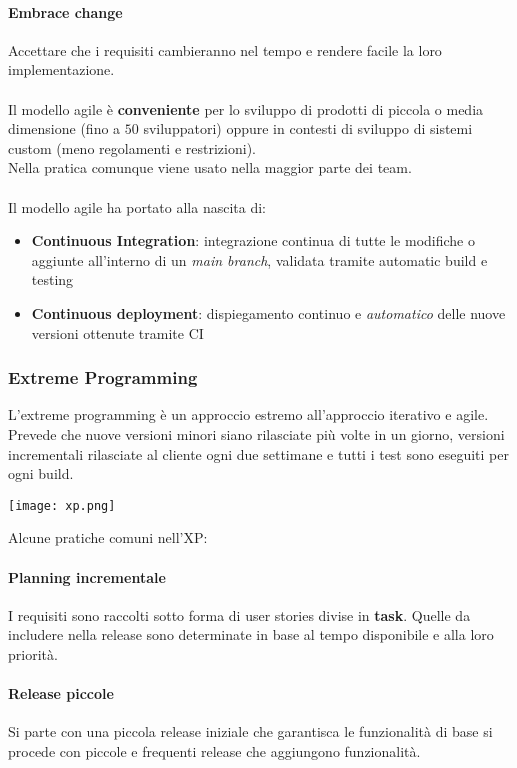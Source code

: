 \paragraph{Embrace change} Accettare che i requisiti cambieranno nel tempo e rendere facile la loro implementazione.\\\\

Il modello agile è \textbf{conveniente} per lo sviluppo di prodotti di piccola o media dimensione (fino a $50$ sviluppatori) oppure in contesti di sviluppo di sistemi custom (meno regolamenti e restrizioni).\\
Nella pratica comunque viene usato nella maggior parte dei team.\\\\

\noindent Il modello agile ha portato alla nascita di:
\begin{itemize}
	\item \textbf{Continuous Integration}: integrazione continua di tutte le modifiche o aggiunte all'interno di un \textit{main branch}, validata tramite automatic build e testing
	\item \textbf{Continuous deployment}: dispiegamento continuo e \textit{automatico} delle nuove versioni ottenute tramite CI
\end{itemize}

\subsubsection{Extreme Programming}
L'extreme programming è un approccio estremo all'approccio iterativo e agile. Prevede che nuove versioni minori siano rilasciate più volte in un giorno, versioni incrementali rilasciate al cliente ogni due settimane e tutti i test sono eseguiti per ogni build.
\begin{center}
	\texttt{[image: xp.png]}
\end{center}

\noindent Alcune pratiche comuni nell'XP:
\paragraph{Planning incrementale} I requisiti sono raccolti sotto forma di user stories divise in \textbf{task}. Quelle da includere nella release sono determinate in base al tempo disponibile e alla loro priorità.
\paragraph{Release piccole} Si parte con una piccola release iniziale che garantisca le funzionalità di base si procede con piccole e frequenti release che aggiungono funzionalità.
